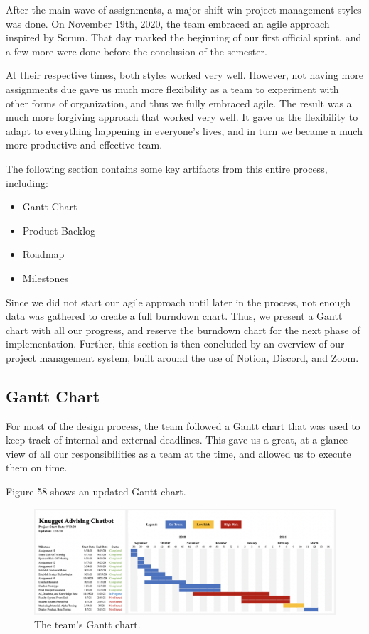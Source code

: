 \documentclass[titlepage, 12pt]{article}
\begin{document}
After the main wave of assignments, a major shift win project management styles was done. On November 19th, 2020, the team embraced an agile approach inspired by Scrum. That day marked the beginning of our first official sprint, and a few more were done before the conclusion of the semester.

At their respective times, both styles worked very well. However, not having more assignments due gave us much more flexibility as a team to experiment with other forms of organization, and thus we fully embraced agile. The result was a much more forgiving approach that worked very well. It gave us the flexibility to adapt to everything happening in everyone’s lives, and in turn we became a much more productive and effective team.

The following section contains some key artifacts from this entire process, including:

\begin{itemize}
    \item Gantt Chart
    \item Product Backlog
    \item Roadmap
    \item Milestones
\end{itemize}

Since we did not start our agile approach until later in the process, not enough data was gathered to create a full burndown chart. Thus, we present a Gantt chart with all our progress, and reserve the burndown chart for the next phase of implementation. Further, this section is then concluded by an overview of our project management system, built around the use of Notion, Discord, and Zoom.

\subsection{Gantt Chart}

For most of the design process, the team followed a Gantt chart that was used to keep track of internal and external deadlines. This gave us a great, at-a-glance view of all our responsibilities as a team at the time, and allowed us to execute them on time.

Figure 58 shows an updated Gantt chart.

\begin{figure}[h]
    \centering\includegraphics[width=1\linewidth]{images/pm/gantt.png}
    \caption{The team's Gantt chart.}
\end{figure}
\end{document}
